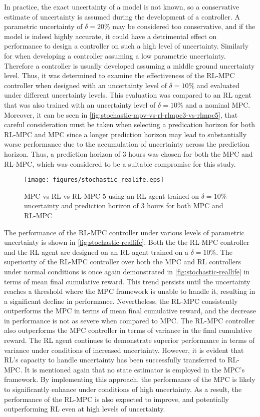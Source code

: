 In practice, the exact uncertainty of a model is not known, so a conservative estimate of uncertainty is assumed during the development of a controller. A parametric uncertainty of $\delta = 20\%$ may be considered too conservative, and if the model is indeed highly accurate, it could have a detrimental effect on performance to design a controller on such a high level of uncertainty. Similarly for when developing a controller assuming a low parametric uncertainty. Therefore a controller is usually developed assuming a middle ground uncertainty level. Thus, it was determined to examine the effectiveness of the RL-MPC controller when designed with an uncertainty level of $\delta = 10\%$ and evaluated under different uncertainty levels. This evaluation was compared to an RL agent that was also trained with an uncertainty level of $\delta = 10\%$ and a nominal MPC. Moreover, it can be seen in \autoref{fig:stochastic-mpv-vs-rl-rlmpc3-vs-rlmpc5}, that careful consideration must be taken when selecting a predication horizon for both RL-MPC and MPC since a longer prediction horizon may lead to substantially worse performance due to the accumulation of uncertainty across the prediction horizon. Thus, a prediction horizon of 3 hours was chosen for both the MPC and RL-MPC, which was considered to be a suitable compromise for this study.



\begin{figure}[H]
	\centering
	\texttt{[image: figures/stochastic\_realife.eps]}
	\caption{MPC vs RL vs RL-MPC 5 using an RL agent trained on $\delta = 10\%$ uncertainty and prediction horizon of 3 hours for both MPC and RL-MPC}
	\label{fig:stochastic-reallife}
\end{figure}

The performance of the RL-MPC controller under various levels of parametric uncertainty is shown in \autoref{fig:stochastic-reallife}. Both the the RL-MPC controller and the RL agent are designed on an RL agent trained on a $\delta = 10\%$. The superiority of the RL-MPC controller over both the MPC and RL controllers under normal conditions is once again demonstrated in \autoref{fig:stochastic-reallife} in terms of mean final cumulative reward. This trend persists  until the uncertainty reaches a threshold where the MPC framework is unable to handle it, resulting in a significant decline in performance. Nevertheless, the RL-MPC consistently outperforms the MPC in terms of mean final cumulative reward, and the decrease in performance is not as severe when compared to MPC. The RL-MPC controller also outperforms the MPC controller in terms of variance in the final cumulative reward. The RL agent continues to demonstrate superior performance in terms of variance under conditions of increased uncertainty. However, it is evident that RL's capacity to handle uncertainty has been successfully transferred to RL-MPC. It is mentioned again that no state estimator is employed in the MPC's framework. By implementing this approach, the performance of the MPC is likely to significantly enhance under conditions of high uncertainty. As a result, the performance of the RL-MPC is also expected to improve, and potentially outperforming RL even at high levels of uncertainty. 


